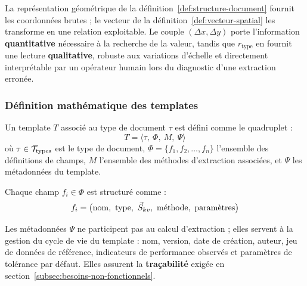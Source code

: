 \begin{remarque}
La représentation géométrique de la définition~\ref{def:structure-document} fournit les
coordonnées brutes ; le vecteur de la définition~\ref{def:vecteur-spatial} les transforme en
une relation exploitable. Le couple $(\Delta x, \Delta y)$ porte l'information
\textbf{quantitative} nécessaire à la recherche de la valeur, tandis que $r_{\text{type}}$
en fournit une lecture \textbf{qualitative}, robuste aux variations d'échelle et directement
interprétable par un opérateur humain lors du diagnostic d'une extraction erronée.
\end{remarque}

\subsubsection{Définition mathématique des templates}

\begin{definition}
\label{def:template}
Un template $T$ associé au type de document $\tau$ est défini comme le quadruplet :
\begin{equation}
T = \langle \tau,\ \Phi,\ M,\ \Psi \rangle
\end{equation}
où $\tau \in \mathcal{T}_{\text{types}}$ est le type de document, $\Phi = \{f_1, f_2, \ldots, f_n\}$ l'ensemble
des définitions de champs, $M$ l'ensemble des méthodes d'extraction associées, et $\Psi$ les
métadonnées du template.
\end{definition}

\begin{definition}
\label{def:champ}
Chaque champ $f_i \in \Phi$ est structuré comme :
\begin{equation}
f_i = \big(\mathrm{nom},\ \mathrm{type},\ \svec,\ \mathrm{m\acute{e}thode},\ \mathrm{param\grave{e}tres}\big)
\end{equation}
\end{definition}

\begin{remarque}
Les métadonnées $\Psi$ ne participent pas au calcul d'extraction ; elles servent à la gestion
du cycle de vie du template : nom, version, date de création, auteur, jeu de données de
référence, indicateurs de performance observés et paramètres de tolérance par défaut. Elles
assurent la \textbf{traçabilité} exigée en section~\ref{subsec:besoins-non-fonctionnels}.
\end{remarque}

